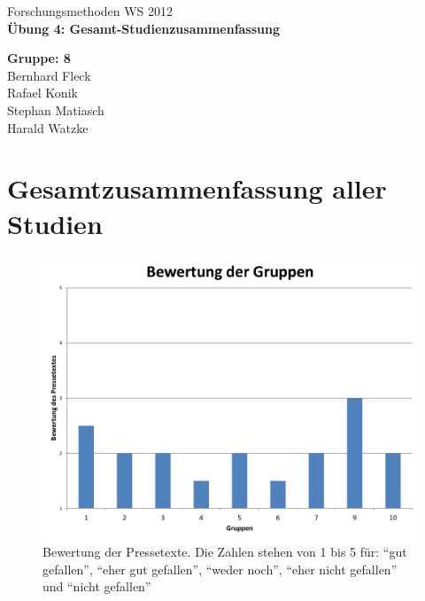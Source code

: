 

 

\begin{titlepage}
\sffamily

{ \Large Forschungsmethoden WS 2012} \\[2cm]
    
{ \Huge \centering \bfseries Übung 4: Gesamt-Studienzusammenfassung \\[1.5cm] }


%

\vfill

{ \large
   { \bfseries Gruppe: 8 \\ }
   Bernhard Fleck \\
   Rafael Konik \\
   Stephan Matiasch \\
   Harald Watzke \\
}
\end{titlepage}


\section{Gesamtzusammenfassung aller Studien} %
\label{sec:zusammenfassung_aller_studien}

\begin{figure}[h!tbp]
    \begin{center}
        \includegraphics[width=\textwidth]{images/bewertungen}
    \end{center}
    \caption{Bewertung der Pressetexte. Die Zahlen 
    stehen von 1 bis 5 für: \enquote{gut gefallen}, \enquote{eher gut 
    gefallen}, \enquote{weder noch}, \enquote{eher nicht gefallen} und 
    \enquote{nicht gefallen}}
    \label{fig:bewertungen}
\end{figure}


